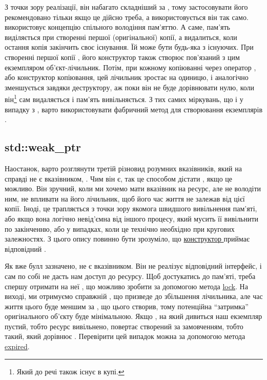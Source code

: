 \documentclass[12pt]{article}
\begin{document}
    З точки зору реалізації, він набагато складніший за , тому застосовувати його рекомендовано тільки якщо це дійсно треба, а використовується він так само.  використовує концепцію спільного володіння пам'яттю. А саме, пам'ять виділяється при створенні першої (оригінальної) копії, а видалиться, коли остання копія закінчить своє існування. Їй може бути будь-яка з існуючих. При створенні першої копії , його конструктор також створює пов'язаний з цим екземпляром об'єкт-лічильник. Потім, при кожному копіюванні через оператор \m{=}, або конструктор копіювання, цей лічильник зростає на одиницю, і аналогічно зменшується завдяки деструктору, аж поки він не буде дорівнювати нулю, коли він\footnote{Який до речі також існує в купі.} сам видаляється і пам'ять вивільняється. З тих самих міркувань, що і у випадку з , варто використовувати фабричний метод  для створювання екземплярів .

    \subsection{std::weak\_ptr}
    Наостанок, варто розглянути третій різновид розумних вказівників, який на справді не є вказівником, \href{https://en.cppreference.com/w/cpp/memory/weak_ptr}{}. Чим він є, так це способом дістати , якщо це можливо. Він зручний, коли ми хочемо мати вказівник на ресурс, але не володіти ним, не впливати на його лічильник, щоб його час життя не залежав від цієї копії. Іноді, це трапляється з точки зору якомога швидшого вивільнення пам'яті, або якщо вона логічно невід'ємна від іншого процесу, який мусить її вивільнити по закінченню, або у випадках, коли це технічно необхідно при кругових залежностях. З цього опису повинно бути зрозуміло, що \href{https://en.cppreference.com/w/cpp/memory/weak_ptr/weak_ptr}{конструктор } приймає відповідний .

    Як вже булл зазначено,  не є вказівником. Він не реалізує відповідний інтерфейс, і сам по собі не дасть нам доступ до ресурсу. Щоб достукатись до пам'яті, треба спершу отримати на неї , що можливо зробити за допомогою метода \href{https://en.cppreference.com/w/cpp/memory/weak_ptr/lock}{lock}. На виході, ми отримуємо справжній , що призведе до збільшення лічильника, але час життя цього  буде меншим за , що цього створив, тому потенційна ``затримка'' оригінального об'єкту буде мінімальною. Якщо , на який дивиться наш екземпляр  пустий, тобто ресурс вивільнено,  повертає  створений за замовченням, тобто такий, який дорівнює . Перевірити цей випадок можна за допомогою метода \href{https://en.cppreference.com/w/cpp/memory/weak_ptr/expired}{expired}.
    
\end{document}
